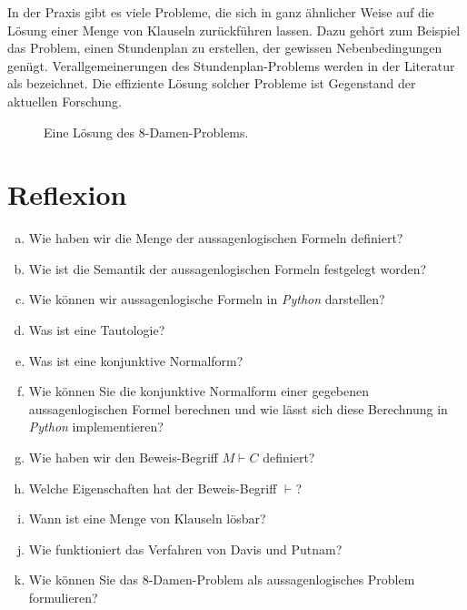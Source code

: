 In der Praxis gibt es viele Probleme, die sich in ganz ähnlicher Weise auf die Lösung einer
Menge von Klauseln zurückführen lassen.  Dazu gehört zum Beispiel das Problem, einen
Stundenplan zu erstellen, der gewissen Nebenbedingungen genügt.  Verallgemeinerungen des
Stundenplan-Problems werden in der Literatur als  bezeichnet.
Die effiziente Lösung solcher Probleme ist Gegenstand der aktuellen Forschung.




\begin{figure}[!ht]
  \centering
  \caption{Eine Lösung des 8-Damen-Problems.}
  \label{fig:8-queens.pdf}
\end{figure}
\FloatBarrier
\vspace*{3cm}

\pagebreak


\section{Reflexion}
\begin{enumerate}[(a)]
\item Wie haben wir die Menge der aussagenlogischen Formeln definiert?
\item Wie ist die Semantik der aussagenlogischen Formeln festgelegt worden?
\item Wie können wir aussagenlogische Formeln in \textsl{Python} darstellen?
\item Was ist eine Tautologie?
\item Was ist eine konjunktive Normalform?
\item Wie können Sie die konjunktive Normalform einer gegebenen aussagenlogischen Formel berechnen und wie lässt
      sich diese Berechnung in \textsl{Python} implementieren?
\item Wie haben wir den Beweis-Begriff $M \vdash C$ definiert?
\item Welche Eigenschaften hat der Beweis-Begriff $\vdash$?
\item Wann ist eine Menge von Klauseln lösbar?
\item Wie funktioniert das Verfahren von Davis und Putnam?
\item Wie können Sie das 8-Damen-Problem als aussagenlogisches Problem formulieren?
\end{enumerate}

%

